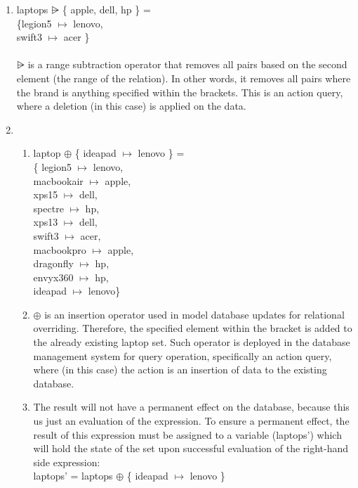 \begin{enumerate}
\item laptops $\nrres$ \{ apple, dell, hp \} = \\
\{legion5 $\mapsto$ lenovo, \\
swift3 $\mapsto$ acer \}
\\ \\
$\nrres$ is a range subtraction operator that removes all pairs based on the second element (the range of the relation). In other words, it removes all pairs where the brand is anything specified within the brackets. This is an action query, where a deletion (in this case) is applied on the data.\\

\item 
\begin {enumerate} 
\item laptop $\oplus$ \{ ideapad $\mapsto$ lenovo \} = \\
\{ legion5 $\mapsto$ lenovo, \\
macbookair $\mapsto$ apple, \\
xps15 $\mapsto$ dell, \\
spectre $\mapsto$ hp, \\
xps13 $\mapsto$ dell, \\
swift3 $\mapsto$ acer, \\
macbookpro $\mapsto$ apple, \\
dragonfly $\mapsto$ hp, \\
envyx360 $\mapsto$ hp, \\
ideapad $\mapsto$ lenovo\} \\

\item $\oplus$ is an insertion operator used in model database updates for relational overriding. Therefore, the specified element within the bracket is added to the already existing laptop set. Such operator is deployed in the database management system for query operation, specifically an action query, where (in this case) the action is an insertion of data to the existing database.  \\

\item The result will not have a permanent effect on the database, because this us just an  evaluation of the expression. To ensure a permanent effect, the result of this expression must be assigned to a variable (laptops') which will hold the state of the set upon successful evaluation of the right-hand side expression: \\
laptops' = laptops $\oplus$ \{ ideapad $\mapsto$ lenovo \}
\end{enumerate}

\end{enumerate}

